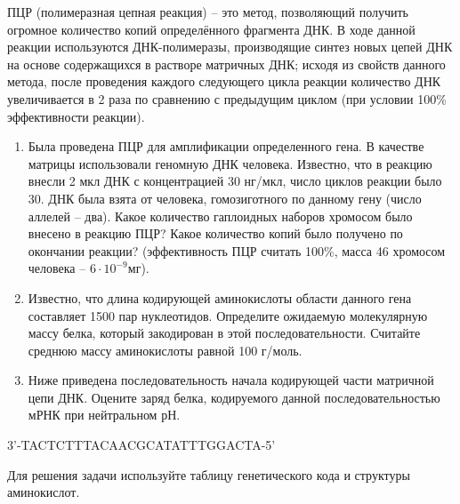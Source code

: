 
ПЦР (полимеразная цепная реакция) – это метод, позволяющий получить огромное количество копий определённого фрагмента ДНК. В ходе данной реакции используются ДНК-полимеразы, производящие синтез новых цепей ДНК на основе содержащихся в растворе матричных ДНК; исходя из свойств данного метода, после проведения каждого следующего цикла реакции количество ДНК увеличивается в 2 раза по сравнению с предыдущим циклом (при условии 100\% эффективности реакции).

\begin{enumerate}
    \item Была проведена ПЦР для амплификации определенного гена. В качестве матрицы использовали геномную ДНК человека. Известно, что в реакцию внесли 2 мкл ДНК с концентрацией 30 нг/мкл, число циклов реакции было 30. ДНК была взята от человека, гомозиготного по данному гену (число аллелей – два). Какое количество гаплоидных наборов хромосом было внесено в реакцию ПЦР? Какое количество копий было получено по окончании реакции? (эффективность ПЦР считать 100\%, масса 46 хромосом человека – $6 \cdot 10^{-9}$мг).
    \item Известно, что длина кодирующей аминокислоты области данного гена составляет 1500 пар нуклеотидов. Определите ожидаемую молекулярную массу белка, который закодирован в этой последовательности. Считайте среднюю массу аминокислоты равной 100 г/моль.
    \item Ниже приведена последовательность начала кодирующей части матричной цепи ДНК. Оцените заряд белка, кодируемого данной последовательностью мРНК при нейтральном рН.
\end{enumerate}
 
\begin{center}
    3’-TACTCTTTACAACGCATATTTGGACTA-5’    
\end{center}


Для решения задачи используйте таблицу генетического кода и структуры аминокислот.


